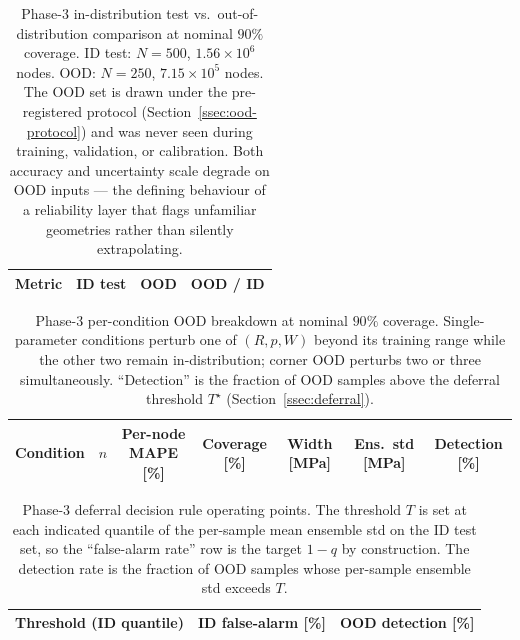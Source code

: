 
\begin{table}[t]
  \centering
  \caption{Phase-3 in-distribution test vs.\ out-of-distribution
    comparison at nominal $90\%$ coverage. ID test: $N = 500$,
    $1.56 \times 10^6$ nodes. OOD: $N = 250$, $7.15 \times 10^5$ nodes.
    The OOD set is drawn under the pre-registered protocol
    (Section~\ref{ssec:ood-protocol}) and was never seen during training,
    validation, or calibration. Both accuracy and uncertainty scale degrade
    on OOD inputs --- the defining behaviour of a reliability layer that
    flags unfamiliar geometries rather than silently extrapolating.}
  \label{tab:phase3-id-vs-ood}
  \begin{tabular}{lccc}
    \toprule
    Metric & ID test & OOD & OOD / ID \\
    \midrule
    
    \bottomrule
  \end{tabular}
\end{table}

\begin{table}[t]
  \centering
  \caption{Phase-3 per-condition OOD breakdown at nominal $90\%$ coverage.
    Single-parameter conditions perturb one of $(R, p, W)$ beyond its
    training range while the other two remain in-distribution; corner OOD
    perturbs two or three simultaneously. ``Detection'' is the fraction of
    OOD samples above the deferral threshold $T^\star$
    (Section~\ref{ssec:deferral}).}
  \label{tab:phase3-conditional}
  \begin{tabular}{lcccccc}
    \toprule
    Condition & $n$ & Per-node MAPE [\%] & Coverage [\%]
      & Width [MPa] & Ens.\ std [MPa] & Detection [\%] \\
    \midrule
    
    \bottomrule
  \end{tabular}
\end{table}

\begin{table}[t]
  \centering
  \caption{Phase-3 deferral decision rule operating points. The threshold
    $T$ is set at each indicated quantile of the per-sample mean ensemble
    std on the ID test set, so the ``false-alarm rate'' row is the target
    $1 - q$ by construction. The detection rate is the fraction of OOD
    samples whose per-sample ensemble std exceeds $T$.}
  \label{tab:phase3-deferral}
  \begin{tabular}{lcc}
    \toprule
    Threshold (ID quantile) & ID false-alarm [\%] & OOD detection [\%] \\
    \midrule
    
    \bottomrule
  \end{tabular}
\end{table}
